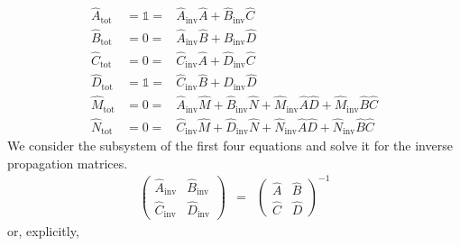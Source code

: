 \documentclass[12pt,a4paper,twoside,openright,BCOR10mm,headsepline,titlepage,abstracton,chapterprefix,final]{scrreprt}
\newcommand\unittensor{\mathds{1}}
\newcommand\tot{\textrm{tot}}
\begin{document}
\begin{subequations}
\begin{eqnarray}
 \hat{A}_\tot &= \unittensor =& \hat{A}_{\text{inv}} \hat{A} + \hat{B}_{\text{inv}} \hat{C} \\
 \hat{B}_\tot &= 0           =& \hat{A}_{\text{inv}} \hat{B} + \hat{B}_{\text{inv}} \hat{D} \\
 \hat{C}_\tot &= 0           =& \hat{C}_{\text{inv}} \hat{A} + \hat{D}_{\text{inv}} \hat{C}\\
 \hat{D}_\tot &= \unittensor =& \hat{C}_{\text{inv}} \hat{B} + \hat{D}_{\text{inv}} \hat{D} \\
 \hat{M}_\tot &= 0           =& \hat{A}_{\text{inv}} \hat{M} + \hat{B}_{\text{inv}} \hat{N} + \hat{M}_{\text{inv}} \hat{A} \hat{D} + \hat{M}_{\text{inv}} \hat{B} \hat{C} \\
 \hat{N}_\tot &= 0           =& \hat{C}_{\text{inv}} \hat{M} + \hat{D}_{\text{inv}} \hat{N} + \hat{N}_{\text{inv}} \hat{A} \hat{D} + \hat{N}_{\text{inv}} \hat{B} \hat{C}
\end{eqnarray}
\end{subequations}
We consider the subsystem of the first four equations and solve it for the inverse propagation matrices.
\begin{eqnarray}
 \begin{pmatrix}
  \hat{A}_{\text{inv}} & \hat{B}_{\text{inv}} \\ \hat{C}_{\text{inv}} & \hat{D}_{\text{inv}}
 \end{pmatrix}
 &=&
 \begin{pmatrix}
  \hat{A} & \hat{B} \\ \hat{C} & \hat{D}
 \end{pmatrix}^{-1}
\end{eqnarray}
or, explicitly,
\end{document}
